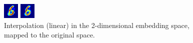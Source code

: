 \documentclass{article}
\begin{document}
\begin{figure}[h]
\begin{minipage}{.09\textwidth}
	\end{minipage}
	\begin{minipage}{.09\textwidth}
		\centering
		\includegraphics[width=\linewidth, scale=0.2]{Python/interp/im_16.png}
	\end{minipage}
	\begin{minipage}{.09\textwidth}
		\centering
		\includegraphics[width=\linewidth, scale=0.2]{Python/interp/im_18.png}
	\end{minipage}
	\caption{Interpolation (linear) in the 2-dimensional embedding space, mapped to the original space.}
	\end{figure}
	
\end{document}
